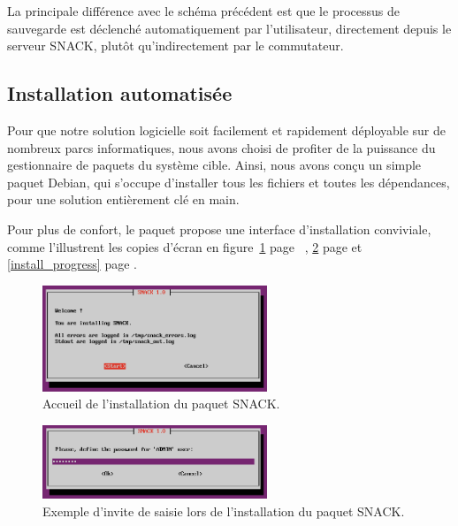 La principale différence avec le schéma précédent est que le processus de sauvegarde est déclenché automatiquement par l'utilisateur, directement depuis le serveur SNACK, plutôt qu'indirectement par le commutateur.

\subsection{Installation automatisée}

Pour que notre solution logicielle soit facilement et rapidement déployable sur de nombreux parcs informatiques, nous avons choisi de profiter de la puissance du gestionnaire de paquets du système cible. Ainsi, nous avons conçu un simple paquet Debian, qui s'occupe d'installer tous les fichiers et toutes les dépendances, pour une solution entièrement clé en main.

Pour plus de confort, le paquet propose une interface d'installation conviviale, comme l'illustrent les copies d'écran en figure~\ref{install_start} page ~\pageref{install_start}, \ref{install_prompt} page \pageref{install_prompt} et \ref{install_progress} page \pageref{install_progress}.

\begin{figure}[!h]
	\begin{center}
	    \includegraphics[width=0.6\textwidth]{img/install_start.png}
	\end{center}
	\caption{Accueil de l'installation du paquet SNACK.}
	\label{install_start}
\end{figure}

\begin{figure}[!h]
	\begin{center}
	    \includegraphics[width=0.6\textwidth]{img/install_prompt.png}
	\end{center}
	\caption{Exemple d'invite de saisie lors de l'installation du paquet SNACK.}
	\label{install_prompt}
\end{figure}

